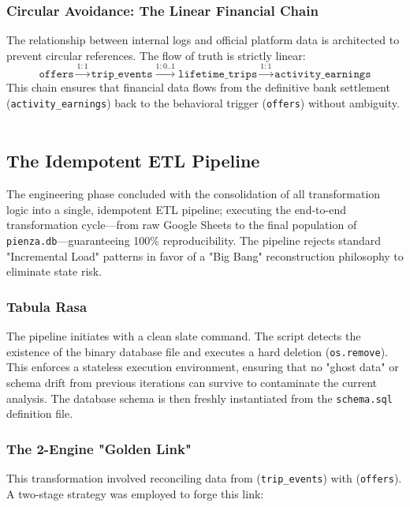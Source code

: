 \subsubsection{Circular Avoidance: The Linear Financial Chain}
The relationship between internal logs and official platform data is architected to prevent circular references. The flow of truth is strictly linear:
\begin{equation}
    \texttt{offers} \xrightarrow{1:1} \texttt{trip\_events} \xrightarrow{1:0..1} \texttt{lifetime\_trips} \xrightarrow{1:1} \texttt{activity\_earnings}
\end{equation}
This chain ensures that financial data flows from the definitive bank settlement (\texttt{activity\_earnings}) back to the behavioral trigger (\texttt{offers}) without ambiguity.
\

\subsection{The Idempotent ETL Pipeline}
The engineering phase concluded with the consolidation of all transformation logic into a single, idempotent ETL pipeline; executing the end-to-end transformation cycle—from raw Google Sheets to the final population of \texttt{pienza.db}—guaranteeing 100\% reproducibility. The pipeline rejects standard "Incremental Load" patterns in favor of a "Big Bang" reconstruction philosophy to eliminate state risk.

\subsubsection{Tabula Rasa}
The pipeline initiates with a clean slate command. The script detects the existence of the binary database file and executes a hard deletion (\texttt{os.remove}). This enforces a stateless execution environment, ensuring that no "ghost data" or schema drift from previous iterations can survive to contaminate the current analysis. The database schema is then freshly instantiated from the \texttt{schema.sql} definition file.



\subsubsection{The 2-Engine "Golden Link"}
This  transformation involved reconciling data from (\texttt{trip\_events}) with (\texttt{offers}). A two-stage strategy was employed to forge this link:


